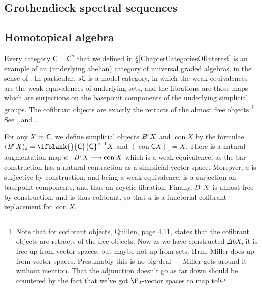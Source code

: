 \documentclass[10pt]{article}
\newcommand{\BarConst}[1]{B^{\smash{\mbox{\tiny $#1$}}}}
\newcommand{\Fr}[2][]{\ifblank{#1}{#2}{#2_{#1}}}
\DeclareMathOperator{\Constant}{con}
\begin{document}
\begin{HomotopicalAlgebra}
\section{Grothendieck spectral sequences}
\subsection{Homotopical algebra}


Every category $\mathsf{C}=\mathsf{C}^n$ that we defined in \S\ref{ChapterCategoriesOfInterest} is an example of an (underlying abelian) category of universal graded algebras, in the sense of \cite{Blanc_Stover-Groth_SS.pdf}. In particular, $s\mathsf{C}$ is a model category, in which the weak equivalences are the weak equivalences of underlying sets, and the fibrations are those maps which are surjections on the basepoint components of the underlying simplicial groups. The cofibrant objects are exactly the retracts of the almost free objects%
\footnote{Note that for cofibrant objects, Quillen, page 4.11, states that the cofibrant objects are retracts of the free objects. Now as we have constructed $\Delta bX$, it is free up from vector spaces, but maybe not up from sets. Hrm. Miller does up from vector spaces. Presumably this is no big deal --- Miller gets around it without mention. That the adjunction doesn't go as far down should be countered by the fact that we've got $\F_2$-vector spaces to map to!}. See \cite{Blanc_Stover-Groth_SS.pdf}, \cite[II\S4]{QuillenHomAlg.pdf} and \cite[\S3]{MillerSullivanConjecture.pdf}.

For any $X$ in $\mathsf{C}$, we define simplicial objects $\BarConst{\mathsf{C}}X$ and $\Constant X$ by the formulae $(\BarConst{\mathsf{C}}X)_s=\Fr{\mathsf{C}}^{s+1}X$ and $(\Constant{\mathsf{C}}X)_s=X$. There is a natural augmentation map $a:\BarConst{\mathsf{C}}X\to\Constant X$ which is a weak equivalence, as the bar construction has a natural contraction as a simplicial vector space. Moreover, $a$ is surjective by construction, and being a weak equivalence, is a surjection on basepoint components, and thus an acyclic fibration. Finally, $\BarConst{\mathsf{C}}X$ is almost free by construction, and is thus cofibrant, so that $a$ is a functorial cofibrant replacement for $\Constant X$.


\end{HomotopicalAlgebra}
\end{document}
